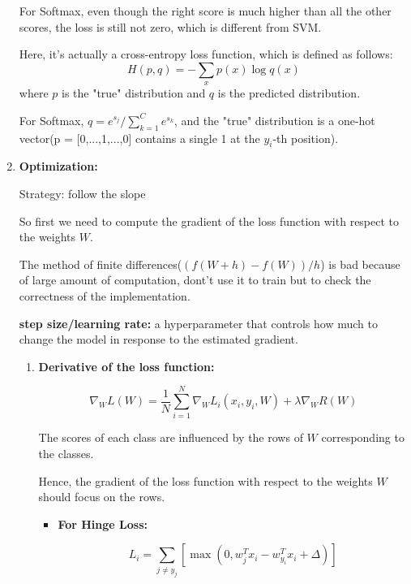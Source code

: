 \documentclass{article}
\numberwithin{equation}{section}
\begin{document}
\begin{CJK}{UTF8}{gbsn}
\begin{enumerate}
    For Softmax, even though the right score is much higher than all the other scores, the loss is still not zero, which is different from SVM.\par
    
    Here, it's actually a cross-entropy loss function, which is defined as follows:
    \begin{equation*}\tag {Cross-entropy}
        H(p, q) = -\sum_{x} p(x) \log q(x)
    \end{equation*}
    where \(p\) is the "true" distribution and \(q\) is the predicted distribution.\par
    For Softmax, \(q = e^{s_j} / \sum_{k=1}^{C} e^{s_k}\), and the "true" distribution is a one-hot vector(p = [0,...,1,...,0] contains a single 1 at the \(y_i\)-th position).\par


    \item \textbf{Optimization:}\par
    Strategy: follow the slope

    So first we need to compute the gradient of the loss function with respect to the weights \(W\).\par
    The method of finite differences(\((f(W+h) - f(W)) / h\)) is bad because of large amount of computation, dont't use it to train but to check the correctness of the implementation.\par

    \vspace{0.5cm}
    \textbf{step size/learning rate:} a hyperparameter that controls how much to change the model in response to the estimated gradient.\par

    \begin{enumerate}
        \item \textbf{Derivative of the loss function:}\par
        \begin{equation}
        \nabla_W L(W) = \frac{1}{N} \sum_{i=1}^{N} \nabla_W L_i(x_i, y_i, W) + \lambda \nabla_W R(W)
        \end{equation}

        The scores of each class are influenced by the rows of \(W\) corresponding to the classes.\par
        Hence, the gradient of the loss function with respect to the weights \(W\) should focus on the rows.\par
        
        \begin{itemize}
            \item \textbf{For Hinge Loss:}\par
            \begin{equation*}
                L_i = \sum_{j \neq y_j} [\max(0, w^T_j x_i - w^T_{y_i} x_i + \Delta)]
            \end{equation*}


\end{itemize}
\end{enumerate}
\end{enumerate}
\end{CJK}
\end{document}

